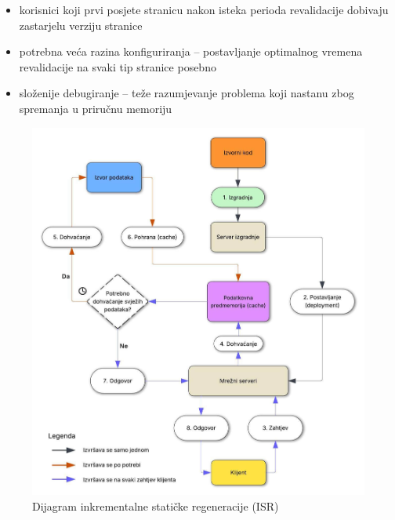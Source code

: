 \begin{itemize}
    \item korisnici koji prvi posjete stranicu nakon isteka perioda revalidacije dobivaju zastarjelu verziju stranice
    \item potrebna veća razina konfiguriranja – postavljanje optimalnog vremena revalidacije na svaki tip stranice posebno
    \item složenije debugiranje – teže razumjevanje problema koji nastanu zbog spremanja u priručnu memoriju
\end{itemize}

\begin{figure}[H]
    \centering
    \includegraphics[width=\textwidth]{slike/uvod/ISR.jpg}
    \caption{Dijagram inkrementalne statičke regeneracije (ISR)}
    \label{fig:isr-diagram}
\end{figure}